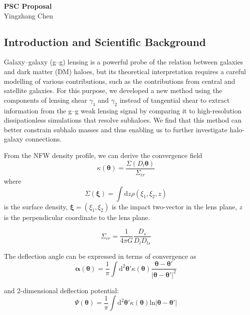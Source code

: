 \documentclass[12pt]{article}
\begin{document}
\topmargin=-2.105cm
\oddsidemargin=-0.1cm
\evensidemargin=0cm

\begin{center}
{\bf PSC Proposal\\}
Yingzhang Chen
\end{center}

\begin{small}


\section{Introduction and Scientific Background}
Galaxy–galaxy (g–g) lensing is a powerful probe of the relation between galaxies and dark matter (DM) haloes, but  its  theoretical  interpretation  requires  a  careful  modelling  of  various  contributions,  such  as  the  contributions from  central  and  satellite  galaxies.  For  this  purpose, we developed a new method using the components of lensing shear $\gamma_1$ and $\gamma_2$ instead of tangential shear to extract information from the g–g weak lensing signal by comparing it to high-resolution dissipationless simulations that resolve subhaloes. We find that this method can better constrain subhalo masses and thus enabling us to further investigate halo-galaxy connections.

From the NFW density profile, we can derive the convergence field
\begin{equation}
    \kappa(\bm{\theta})=\frac{\Sigma(D_l\bm{\theta})}{\Sigma_{cr}}
\end{equation}
where
\begin{equation}
    \Sigma(\bm{\xi}) = \int \mathrm{d}z \rho(\xi_1,\xi_2,z)
\end{equation}
is the surface density, $\bm{\xi}=(\xi_1,\xi_2)$ is the impact two-vector in the lens plane, $z$ is the perpendicular coordinate to the lens plane.

\begin{equation}
    \Sigma_{cr} = \frac{1}{4\pi G} \frac{D_s}{D_l D_{ls}}
\end{equation}

The deflection angle can be expressed in terms of convergence as 
\begin{equation}
    \bm{\alpha}(\bm{\theta}) = \frac{1}{\pi}\int \mathrm{d}^2 \bm{\theta}'\kappa(\bm{\theta})\frac{\bm{\theta} - \bm{\theta}'}{|\bm{\theta} - \bm{\theta}'|^2}
\end{equation}

and 2-dimensional deflection potential:
\begin{equation}
    \Psi(\bm{\theta})=\frac{1}{\pi}\int \mathrm{d}^2 \bm{\theta}'\kappa(\bm{\theta})\mathrm{ln}|\bm{\theta} - \bm{\theta}'|
\end{equation}


\end{small}
\end{document}
